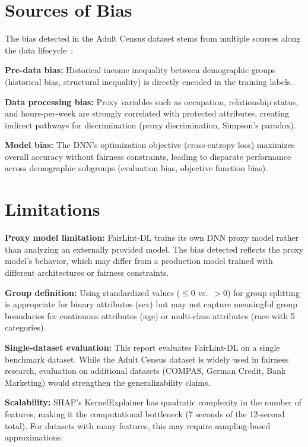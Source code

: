 \section{Sources of Bias}

The bias detected in the Adult Census dataset stems from multiple sources along the data lifecycle~\cite{barocas-hardt-narayanan}:

\textbf{Pre-data bias:} Historical income inequality between demographic groups (historical bias, structural inequality) is directly encoded in the training labels.

\textbf{Data processing bias:} Proxy variables such as occupation, relationship status, and hours-per-week are strongly correlated with protected attributes, creating indirect pathways for discrimination (proxy discrimination, Simpson's paradox).

\textbf{Model bias:} The DNN's optimization objective (cross-entropy loss) maximizes overall accuracy without fairness constraints, leading to disparate performance across demographic subgroups (evaluation bias, objective function bias).

\section{Limitations}

\textbf{Proxy model limitation:} FairLint-DL trains its own DNN proxy model rather than analyzing an externally provided model. The bias detected reflects the proxy model's behavior, which may differ from a production model trained with different architectures or fairness constraints.

\textbf{Group definition:} Using standardized values ($\leq 0$ vs.\ $> 0$) for group splitting is appropriate for binary attributes (sex) but may not capture meaningful group boundaries for continuous attributes (age) or multi-class attributes (race with 5 categories).

\textbf{Single-dataset evaluation:} This report evaluates FairLint-DL on a single benchmark dataset. While the Adult Census dataset is widely used in fairness research, evaluation on additional datasets (COMPAS, German Credit, Bank Marketing) would strengthen the generalizability claims.

\textbf{Scalability:} SHAP's KernelExplainer has quadratic complexity in the number of features, making it the computational bottleneck (7 seconds of the 12-second total). For datasets with many features, this may require sampling-based approximations.


